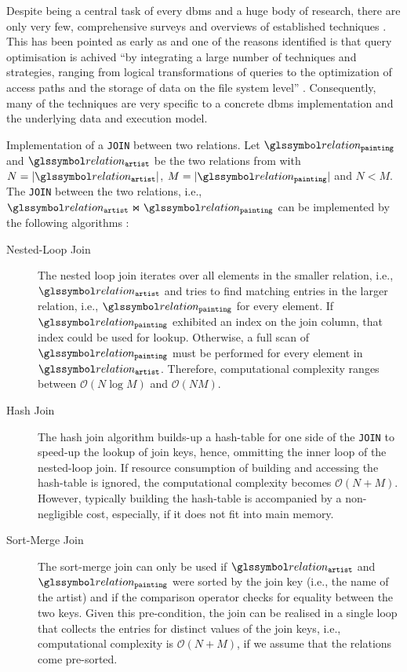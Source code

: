 Despite being a central task of every \acrshort{dbms} and a huge body of research, there are only very few, comprehensive surveys and overviews of established techniques \cite{Jarke:1984Query,Graefe:1993Query,Chaudhuri:1998An}. This has been pointed as early as \citeyear{Jarke:1984Query} and one of the reasons identified is that query optimisation is achived ``by integrating a large number of techniques and strategies, ranging from logical transformations of queries to the optimization of access paths and the storage of data on the file system level'' \cite{Jarke:1984Query}. Consequently, many of the techniques are very specific to a concrete \acrshort{dbms} implementation and the underlying data and execution model.

\begin{example}[label=example:join_algorithm]{Implementation of a \texttt{JOIN} between two relations.}{}
    Let $\relation_{\mathtt{painting}}$ and $\relation_{\mathtt{artist}}$ be the two relations from  with $N = |\relation_{\mathtt{artist}}|$, $M = |\relation_{\mathtt{painting}}|$ and $N < M$. The \texttt{JOIN} between the two relations, i.e., $\relation_{\mathtt{artist}} \Join \relation_{\mathtt{painting}}$ can be implemented by the following algorithms \cite{Graefe:1993Query}:

    \begin{description}
        \item[Nested-Loop Join] The nested loop join iterates over all elements in the smaller relation, i.e., $\relation_{\mathtt{artist}}$ and tries to find matching entries in the larger relation, i.e., $\relation_{\mathtt{painting}}$ for every element. If $\relation_{\mathtt{painting}}$ exhibited an index on the join column, that index could be used for lookup. Otherwise, a full scan of $\relation_{\mathtt{painting}}$ must be performed for every element in $\relation_{\mathtt{artist}}$. Therefore, computational complexity ranges between $\mathcal{O}(N \log M)$ and $\mathcal{O}(NM)$.
        \item[Hash Join] The hash join algorithm builds-up a hash-table for one side of the  \texttt{JOIN} to speed-up the lookup of join keys, hence, ommitting the inner loop of the nested-loop join. If resource consumption of building and accessing the hash-table is ignored, the computational complexity becomes $\mathcal{O}(N + M)$. However, typically building the hash-table is accompanied by a non-negligible cost, especially, if it does not fit into main memory.
        \item[Sort-Merge Join] The sort-merge join can only be used if $\relation_{\mathtt{artist}}$ and $\relation_{\mathtt{painting}}$ were sorted by the join key (i.e., the name of the artist) and if the comparison operator checks for equality between the two keys. Given this pre-condition, the join can be realised in a single loop that collects the entries for distinct values of the join keys, i.e.,  computational complexity is  $\mathcal{O}(N + M)$, if we assume that the relations come pre-sorted.  
    \end{description}
\end{example}

